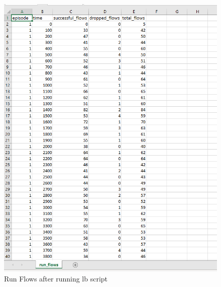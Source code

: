 \begin{figure}[h]
    \centering
    \includegraphics[width=1\textwidth]{lbrunflows}
    \caption{Run Flows after running lb script}
    \label{fig:lbrunflows}
\end{figure}